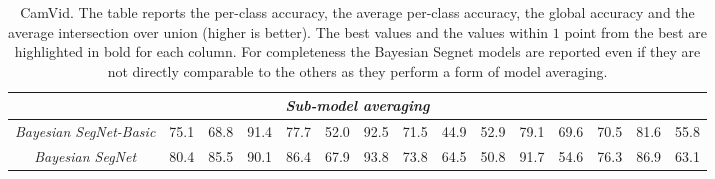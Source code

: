 \begin{table}[t]
{{\begin{tabular}{c|c|c|c|c|c|c|c|c|c|c|c||c|c|c}
				\multicolumn{15}{c}{\emph{Sub-model averaging}} \\ \hline
                \emph{Bayesian SegNet-Basic} \citep{Kendall2015bayesiansegnet} & 75.1 & 68.8 & 91.4 & 77.7 & 52.0 & 92.5 & 71.5 & 44.9 & 52.9 & 79.1 & 69.6 & 70.5 & 81.6 & 55.8 \\ \hline
                \emph{Bayesian SegNet} \citep{Kendall2015bayesiansegnet} & 80.4 & 85.5 & 90.1 & 86.4 & 67.9 & 93.8 & 73.8 & 64.5 & 50.8 & 91.7 & 54.6 & 76.3 & 86.9 & 63.1 \\ \hline

			\end{tabular}
		}
    }
	\vspace*{0.1cm}
    \caption{%
        CamVid. The table reports the per-class accuracy, the average per-class
        accuracy, the global accuracy and the average intersection over union
        (higher is better). The best values and the values within $1$ point
        from the best are highlighted in bold for each column. For completeness
        the Bayesian Segnet models are reported even if they are not directly
        comparable to the others as they perform a form of model averaging.}
    \label{tbl:camvid_SOTA}
\end{table}

